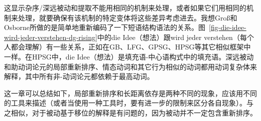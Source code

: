 \zl
这显示杂序/深远被动和提取不能用相同的机制来处理，或者如果它们用相同的机制来处理，就要确保有该机制的特定变体将这些差异考虑进去。我想Groß和Osborne所做的是简单地重新编码了一下短语结构语法的关系。图~\ref{fig-die-idee-wird-jeder-verstehen-dg-rising}中的die Idee（想法）跟wird jeder verstehen（每个人都会理解）有一些关系，正如在GB、LFG、GPSG、HPSG等其它相似框架中一样。在HPSG中，die Idee（想法）是填充语-中心语构式中的填充语。深远被动和助动词论元的局部重新排序、情态动词和其它行为相似的动词都用动词复杂体来解释，其中所有非-动词论元都依赖于最高动词\citep{HN94a}。

这一章可以总结如下，局部重新排序和长距离依存是两种不同的现象，应该用不同的工具来描述（或者当使用一种工具时，要有进一步的限制来区分各自现象）。与之相似，对于被动基于移位的解释是有问题的，因为被动并不一定包含重新排序。


